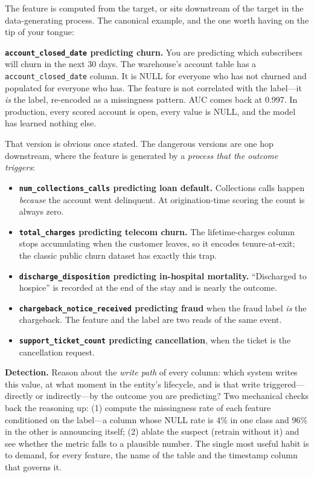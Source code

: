 The feature is computed from the target, or sits downstream of the target in the data-generating process. The canonical example, and the one worth having on the tip of your tongue:

\textbf{\texttt{account\_closed\_date} predicting churn.} You are predicting which subscribers will churn in the next 30 days. The warehouse's account table has a \texttt{account\_closed\_date} column. It is NULL for everyone who has not churned and populated for everyone who has. The feature is not correlated with the label---it \emph{is} the label, re-encoded as a missingness pattern. AUC comes back at 0.997. In production, every scored account is open, every value is NULL, and the model has learned nothing else.

That version is obvious once stated. The dangerous versions are one hop downstream, where the feature is generated by a \emph{process that the outcome triggers}:
\begin{itemize}
    \item \textbf{\texttt{num\_collections\_calls} predicting loan default.} Collections calls happen \emph{because} the account went delinquent. At origination-time scoring the count is always zero.
    \item \textbf{\texttt{total\_charges} predicting telecom churn.} The lifetime-charges column stops accumulating when the customer leaves, so it encodes tenure-at-exit; the classic public churn dataset has exactly this trap.
    \item \textbf{\texttt{discharge\_disposition} predicting in-hospital mortality.} ``Discharged to hospice'' is recorded at the end of the stay and is nearly the outcome.
    \item \textbf{\texttt{chargeback\_notice\_received} predicting fraud} when the fraud label \emph{is} the chargeback. The feature and the label are two reads of the same event.
    \item \textbf{\texttt{support\_ticket\_count} predicting cancellation}, when the ticket is the cancellation request.
\end{itemize}

\textbf{Detection.} Reason about the \emph{write path} of every column: which system writes this value, at what moment in the entity's lifecycle, and is that write triggered---directly or indirectly---by the outcome you are predicting? Two mechanical checks back the reasoning up: (1) compute the missingness rate of each feature conditioned on the label---a column whose NULL rate is 4\% in one class and 96\% in the other is announcing itself; (2) ablate the suspect (retrain without it) and see whether the metric falls to a plausible number. The single most useful habit is to demand, for every feature, the name of the table and the timestamp column that governs it.

